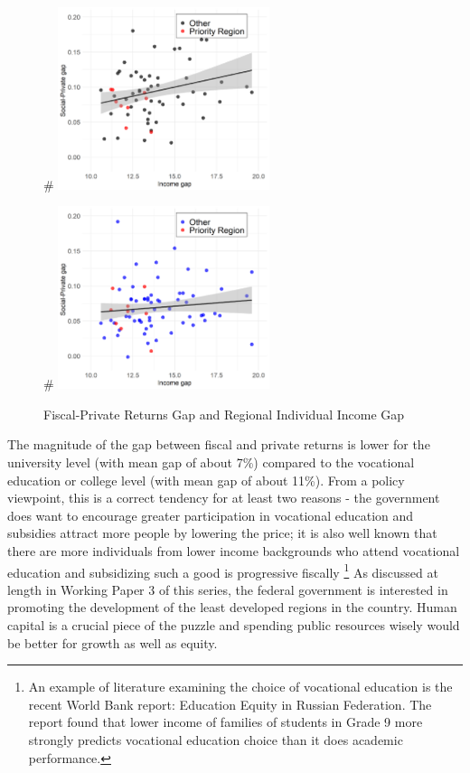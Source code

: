 \documentclass[alpha-refs]{wiley-article-05g}
\begin{document}
\begin{figure}[htbp!]
	\begin{minipage}[b]{.5\linewidth}
		\centering
		#\hspace*{-0.2in}
		\includegraphics[width=175pt]{igap_c.png}
	\end{minipage}
	\hfill
	\begin{minipage}[b]{.5\linewidth}
		\centering
		#\hspace*{-0.2in}
		\includegraphics[width=175pt]{igap_u.png}
	\end{minipage}
	\caption{Fiscal-Private Returns Gap and Regional Individual Income Gap}\label{fig:1.5}
\end{figure}

The magnitude of the gap between fiscal and private returns is lower for the university level (with mean gap of about 7\%) compared to the vocational education or college level (with mean gap of about 11\%). From a policy viewpoint, this is a correct tendency for at least two reasons - the government does want to encourage greater participation in vocational education and subsidies attract more people by lowering the price; it is also well known that there are more individuals from lower income backgrounds who attend vocational education and subsidizing such a good is progressive fiscally \footnote{An example of literature examining the choice of vocational education is  the recent World Bank report: Education Equity in Russian Federation. The report found that lower income of families of students in Grade 9 more strongly predicts vocational education choice than it does academic performance.} As discussed at length in Working Paper 3 of this series, the federal government is interested in promoting the development of the least developed regions in the country. Human capital is a crucial piece of the puzzle and spending public resources wisely would be better for growth as well as equity.  
\end{document}
